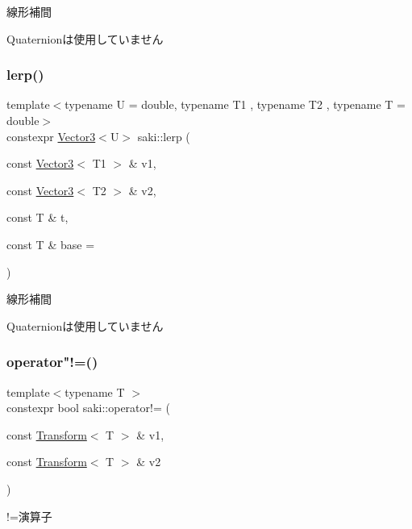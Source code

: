 線形補間 

Quaternionは使用していません \mbox{\label{namespacesaki_a3530d2e9468376228a3836112bd423c1}} 
\subsubsection{\texorpdfstring{lerp()}{lerp()}\hspace{0.1cm}{\footnotesize\ttfamily [3/3]}}
{\footnotesize\ttfamily template$<$typename U  = double, typename T1 , typename T2 , typename T  = double$>$ \\
constexpr \mbox{\hyperlink{classsaki_1_1_vector3}{Vector3}}$<$U$>$ saki\+::lerp (\begin{DoxyParamCaption}\item[{const \mbox{\hyperlink{classsaki_1_1_vector3}{Vector3}}$<$ T1 $>$ \&}]{v1,  }\item[{const \mbox{\hyperlink{classsaki_1_1_vector3}{Vector3}}$<$ T2 $>$ \&}]{v2,  }\item[{const T \&}]{t,  }\item[{const T \&}]{base = {} }\end{DoxyParamCaption})}



線形補間 

Quaternionは使用していません \mbox{\label{namespacesaki_a0133284e616db2357d94a6cf561e7f60}} 
\subsubsection{\texorpdfstring{operator"!=()}{operator!=()}\hspace{0.1cm}{\footnotesize\ttfamily [1/10]}}
{\footnotesize\ttfamily template$<$typename T $>$ \\
constexpr bool saki\+::operator!= (\begin{DoxyParamCaption}\item[{const \mbox{\hyperlink{classsaki_1_1_transform}{Transform}}$<$ T $>$ \&}]{v1,  }\item[{const \mbox{\hyperlink{classsaki_1_1_transform}{Transform}}$<$ T $>$ \&}]{v2 }\end{DoxyParamCaption})}



!=演算子 

